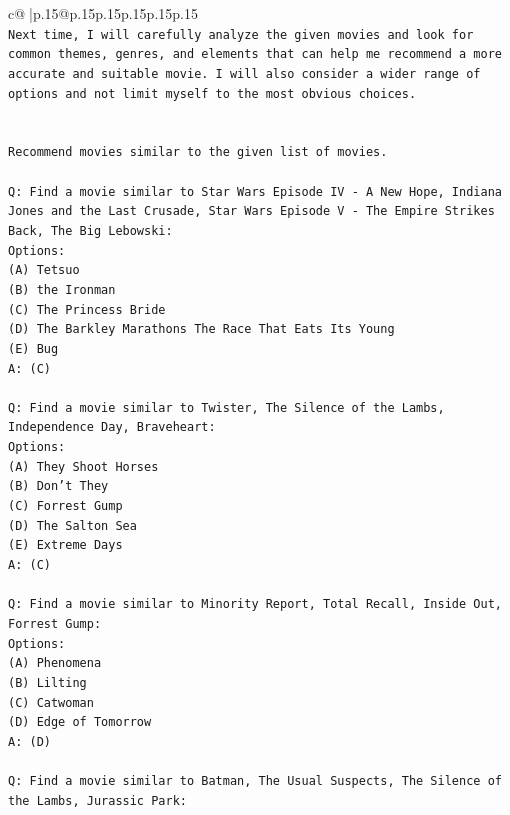 \documentclass{article}
\begin{document}
{\begin{supertabular}{c@{$\;$}|p{.15\linewidth}@{}p{.15\linewidth}p{.15\linewidth}p{.15\linewidth}p{.15\linewidth}p{.15\linewidth}}
{{{\\ 
\texttt{Next time, I will carefully analyze the given movies and look for common themes, genres, and elements that can help me recommend a more accurate and suitable movie. I will also consider a wider range of options and not limit myself to the most obvious choices.} \\
\\ 
\\ 
\texttt{Recommend movies similar to the given list of movies.} \\
\\ 
\texttt{Q: Find a movie similar to Star Wars Episode IV {-} A New Hope, Indiana Jones and the Last Crusade, Star Wars Episode V {-} The Empire Strikes Back, The Big Lebowski:} \\
\texttt{Options:} \\
\texttt{(A) Tetsuo} \\
\texttt{(B) the Ironman} \\
\texttt{(C) The Princess Bride} \\
\texttt{(D) The Barkley Marathons The Race That Eats Its Young} \\
\texttt{(E) Bug} \\
\texttt{A: (C)} \\
\\ 
\texttt{Q: Find a movie similar to Twister, The Silence of the Lambs, Independence Day, Braveheart:} \\
\texttt{Options:} \\
\texttt{(A) They Shoot Horses} \\
\texttt{(B) Don't They} \\
\texttt{(C) Forrest Gump} \\
\texttt{(D) The Salton Sea} \\
\texttt{(E) Extreme Days} \\
\texttt{A: (C)} \\
\\ 
\texttt{Q: Find a movie similar to Minority Report, Total Recall, Inside Out, Forrest Gump:} \\
\texttt{Options:} \\
\texttt{(A) Phenomena} \\
\texttt{(B) Lilting} \\
\texttt{(C) Catwoman} \\
\texttt{(D) Edge of Tomorrow} \\
\texttt{A: (D)} \\
\\ 
\texttt{Q: Find a movie similar to Batman, The Usual Suspects, The Silence of the Lambs, Jurassic Park:} \\
}}}
\end{supertabular}}
\end{document}
